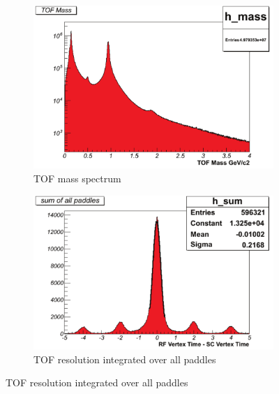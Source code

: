 \begin{figure}\begin{center}
    \begin{subfigure}{0.5\columnwidth}\begin{center}
        \includegraphics[width=.9\linewidth]{figures/calib/tof/Tof_56855_final_mass.pdf}
        \caption{TOF mass spectrum}
        \label{plt:tofmass}
    \end{center}\end{subfigure}\begin{subfigure}{0.5\columnwidth}\begin{center}
        \includegraphics[width=.9\linewidth]{figures/calib/tof/Tof_56855_final_resolution.pdf}
        \caption{TOF resolution integrated over all paddles}
        \label{plt:tofres}
    \end{center}\end{subfigure}
\end{center}\end{figure}

